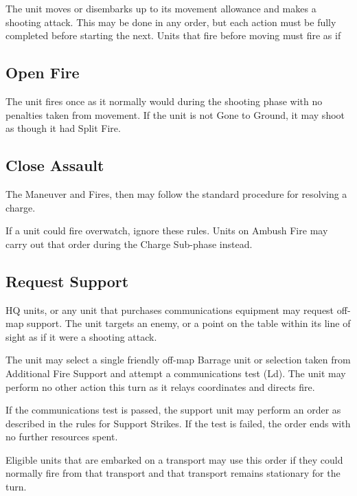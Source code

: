 \documentclass[letterpaper,twocolumn,oneside,titlepage]{book}
\begin{document}
The unit moves or disembarks up to its movement allowance and makes a
shooting attack. This may be done in any order, but each action must be
fully completed before starting the next. Units that fire before moving
must fire as if

\subsection{\texorpdfstring{\textbf{Open
Fire}}{Open Fire}}\label{open-fire}

The unit fires once as it normally would during the shooting phase with
no penalties taken from movement. If the unit is not Gone to Ground, it
may shoot as though it had Split Fire.

\subsection{\texorpdfstring{\textbf{Close
Assault}}{Close Assault}}\label{close-assault}

The Maneuver and Fires, then may follow the standard procedure for
resolving a charge.

If a unit could fire overwatch, ignore these rules. Units on Ambush Fire
may carry out that order during the Charge Sub-phase instead.

\subsection{\texorpdfstring{\textbf{Request
Support}}{Request Support}}\label{request-support}

HQ units, or any unit that purchases communications equipment  may request
off-map support. The unit targets an enemy, or a point on the table within its 
line of sight as if it were a shooting attack.

The unit may select a single friendly off-map Barrage unit or selection
taken from Additional Fire Support and attempt a communications test
(Ld). The unit may perform no other action this turn as it relays
coordinates and directs fire.

If the communications test is passed, the support unit may perform an
order as described in the rules for Support Strikes. If the test is
failed, the order ends with no further resources spent.

Eligible units that are embarked on a transport may use this order if
they could normally fire from that transport and that transport remains
stationary for the turn.
\end{document}

